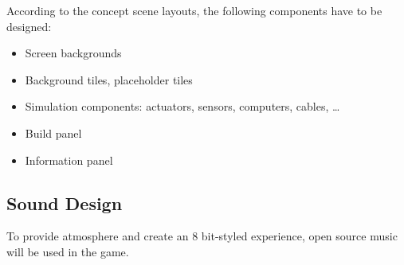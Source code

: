 According to the concept scene layouts, the following components have to be designed:
\begin{itemize}
    \item Screen backgrounds
    \item Background tiles, placeholder tiles
    \item Simulation components: actuators, sensors, computers, cables, \ldots
    \item Build panel
    \item Information panel
\end{itemize}

\subsection{Sound Design}\label{subsec:sound-design}
To provide atmosphere and create an 8 bit-styled experience, open source music will be used in the game.

